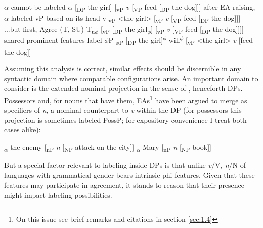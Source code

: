 \documentclass[output=paper
,modfonts
,nonflat]{langsci/langscibook}
\begin{document}
\begin{exe} 
\ex \label{ex:1} \xlist
	\ex \label{ex:1a} $\alpha$ cannot be labeled\newline
	{\lbrack}$\alpha$ [\textsubscript{DP} the girl] [\textsubscript{vP} \textit{v} [\textsubscript{VP} feed [\textsubscript{DP} the dog]]]{\rbrack} 
	\ex \label{ex:1b}after EA raising, $\alpha$ labeled vP based on its head v\newline
	{\lbrack}\textsubscript{vP} {\textless}the girl{\textgreater} [\textsubscript{vP} \textit{v} [\textsubscript{VP} feed [\textsubscript{DP} the dog]]]{\rbrack} 
	\ex \label{ex:1c} ...but first, Agree (T, SU)\newline
	{\lbrack}T\textsubscript{u$\phi$} [\textsubscript{vP} [\textsubscript{DP} the girl\textsubscript{$\phi$}] [\textsubscript{vP} \textit{v} [\textsubscript{VP} feed [\textsubscript{DP} the dog]]]]{\rbrack} 
	\ex \label{ex:d}shared prominent features label $\phi$P\newline
	{\lbrack}\textsubscript{$\phi$P} [\textsubscript{DP} the girl]\textsuperscript{$\phi$} will\textsuperscript{$\phi$} [\textsubscript{vP} <the girl> \textit{v} [feed the dog]]{\rbrack}  
\endxlist
\end{exe}
Assuming this analysis is correct, similar effects should be discernible in any syntactic domain where comparable configurations arise. An important domain to consider is the extended nominal projection in the sense of \citet{Grimshaw19912005}, henceforth DPs. Possessors and, for nouns that have them, EAs\footnote{On this issue see brief remarks and citations in section \ref{sec:1.4}} have been argued to merge as specifiers of \textit{n}, a nominal counterpart to \textit{v} within the DP (for possessors this projection is sometimes labeled PossP; for expository convenience I treat both cases alike): 

\begin{exe}
\ex \label{ex:2}\xlist
	\ex {\lbrack}\textsubscript{$\alpha$} the enemy [\textsubscript{nP} \textit{n} [\textsubscript{NP} attack on the city]]{\rbrack}
	\ex {\lbrack}\textsubscript{$\alpha$} Mary [\textsubscript{nP} \textit{n} [\textsubscript{NP} book]]{\rbrack}
\endxlist
\end{exe}
But a special factor relevant to labeling inside DPs is that unlike \textit{v}/V\textit{, n}/N of languages with grammatical gender bears intrinsic phi-features. Given that these features may participate in agreement, it stands to reason that their presence might impact labeling possibilities.
\end{document}
